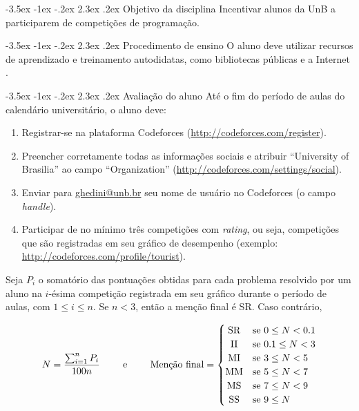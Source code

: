 \documentclass{UnBExam}%
\makeatletter
\renewcommand\section{\@startsection{section}{1}{\z@}%
	{-3.5ex \@plus -1ex \@minus -.2ex}%
	{2.3ex \@plus.2ex}%
	{\normalfont\normalsize\bfseries}}%
\renewcommand{\indent}{\hspace{.5cm}}
\makeatother
\begin{document}
	
\section{Objetivo da disciplina}
\indent Incentivar alunos da UnB a participarem de competições de programação.

\section{Procedimento de ensino}
\indent O aluno deve utilizar recursos de aprendizado e treinamento autodidatas, como bibliotecas públicas e a Internet \cite{halim2013competitive,cormen2009introduction,pimentaarticle}.

\section{Avaliação do aluno}
\indent Até o fim do período de aulas do calendário universitário, o aluno deve:
\begin{enumerate}
	\item Registrar-se na plataforma Codeforces (\url{http://codeforces.com/register}).
	\item Preencher corretamente todas as informações sociais e atribuir ``University of Brasilia'' ao campo ``Organization'' (\url{http://codeforces.com/settings/social}).
	\item Enviar para \url{ghedini@unb.br} seu nome de usuário no Codeforces (o campo \textit{handle}).
	\item Participar de no mínimo três competições com \textit{rating}, ou seja, competições que são registradas em seu gráfico de desempenho (exemplo: \url{http://codeforces.com/profile/tourist}).
\end{enumerate}
\indent Seja $P_i$ o somatório das pontuações obtidas para cada problema resolvido por um aluno na $i$-ésima competição registrada em seu gráfico durante o período de aulas, com $1 \leq i \leq n$. Se $n < 3$, então a menção final é SR. Caso contrário,

\vspace{-.7cm}
\[
\begin{array}{ccc}
	N = \dfrac{\sum_{i=1}^{n} P_i}{100n} & \;\;\;\;\; \text{e} \;\;\;\;\; & 
	\text{Menção final} =
	\begin{cases}
	\hfill \text{SR} \hfill & \text{se } 0 \leq N < 0.1 \\
	\hfill \text{II} \hfill & \text{se } 0.1 \leq N < 3 \\
	\hfill \text{MI} \hfill & \text{se } 3 \leq N < 5 \\
	\hfill \text{MM} \hfill & \text{se } 5 \leq N < 7 \\
	\hfill \text{MS} \hfill & \text{se } 7 \leq N < 9 \\
	\hfill \text{SS} \hfill & \text{se } 9 \leq N \\
	\end{cases}
\end{array}
\]
\end{document}
